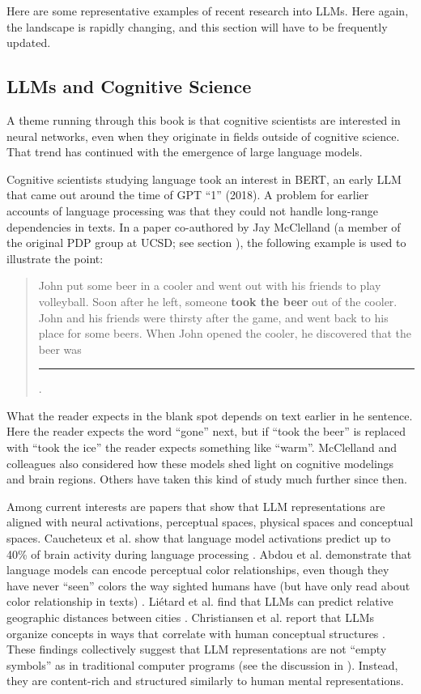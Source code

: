Here are some representative examples of recent research into LLMs.  Here again, the landscape is rapidly changing, and this section will have to be frequently updated.

\subsection{LLMs and Cognitive Science}\label{llm_cogsci}

A theme running through this book is that cognitive scientists are interested in neural networks, even when they originate in fields outside of cognitive science. That trend has continued with the emergence of large language models.

Cognitive scientists studying language took an interest in BERT, an early LLM that came out around the time of GPT ``1'' (2018).  A problem for earlier accounts of language processing was that they could not handle long-range dependencies in texts. In a paper co-authored by Jay McClelland  \cite{mcclelland2020placing} (a member of the original PDP group at UCSD; see section ), the following example is used to illustrate the point:
\begin{quote}
John put some beer in a cooler and went out with his friends to play volleyball. Soon after he left, someone \textbf{took the beer} out of the cooler. John and his friends were thirsty after the game, and went back to his place for some beers. When John opened the cooler, he discovered that the beer was \rule{1cm}{0.15mm}.
\end{quote}
What the reader expects in the blank spot  depends on text earlier in he sentence.  Here the reader expects the word ``gone'' next, but if ``took the beer'' is replaced with ``took the ice'' the reader expects something like ``warm''.  McClelland and colleagues also considered how these models shed light on cognitive modelings and brain regions. Others have taken this kind of study much further since then.

Among current interests are papers that show that LLM representations are aligned with neural activations,  perceptual spaces,  physical spaces and conceptual spaces. Caucheteux et al. show that language model activations predict up to 40\% of brain activity during language processing \cite{caucheteux2022brains}. Abdou et al. demonstrate that language models can encode perceptual color relationships, even though they have never ``seen'' colors the way sighted humans have (but have only read about color relationship in texts) \cite{abdou2021can}.  Liétard et al. find that LLMs can predict relative geographic distances between cities \cite{lietard2021do}.  Christiansen et al. report that LLMs organize concepts in ways that correlate with human conceptual structures \cite{christiansen2023large}. These findings collectively suggest that LLM representations are not ``empty symbols'' as in traditional computer programs (see the discussion in ). Instead, they are content-rich and structured similarly to human mental representations.

